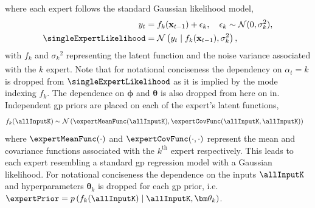\documentclass{mimosis-class/mimosis}
\numberwithin{equation}{chapter}
\newcommand{\numData}{\ensuremath{t}}
\newcommand{\modeInd}{\ensuremath{k}}
\newcommand{\singleData}[1]{\ensuremath{#1_{\numData}}}
\newcommand{\allData}[1]{\ensuremath{\MakeUppercase{#1}}}
\newcommand{\mode}[1]{\ensuremath{#1_{\modeInd}}}
\newcommand{\x}{\ensuremath{\mathbf{x}}}
\newcommand{\y}{\ensuremath{y}}
\newcommand{\singleInput}{\ensuremath{\x_{\numData-1}}}
\newcommand{\singleOutput}{\ensuremath{\singleData{\y}}}
\newcommand{\allInput}{\ensuremath{\allData{\x}}}
\newcommand{\noiseVar}{\ensuremath{\sigma}}
\newcommand{\modeVar}{\ensuremath{\alpha}}
\newcommand{\modeVarn}{\ensuremath{\singleData{\modeVar}}}
\newcommand{\modeVarK}{\ensuremath{\modeVarn=\modeInd}}
\newcommand{\latentFunc}{\ensuremath{f}}
\newcommand{\gatingParams}{\ensuremath{\bm\phi}}
\newcommand{\expertParams}{\ensuremath{\bm\theta}}
\newcommand{\expertParamsK}{\ensuremath{\mode{\bm\theta}}}
\begin{document}
{where each expert follows the standard Gaussian likelihood model,
\begin{align} \label{eq-expert-likelihood}
\singleOutput &= \mode{f}(\singleInput) + \epsilon_{k}, \quad \epsilon_{k} \sim \mathcal{N}(0, \mode{\noiseVar}^2), \\
\singleExpertLikelihood &= \mathcal{N}\left( \singleOutput \mid \mode{f}(\singleInput), \mode{\noiseVar}^2 \right),
\end{align}
with \(\mode{f}\) and \(\mode{\noiseVar}^2\) representing the latent function and the noise variance associated
with the \(\modeInd\)\textsuperscript{} expert.
Note that for notational conciseness the dependency on \(\modeVarK\) is dropped from
\(\singleExpertLikelihood\) as it is implied by the mode indexing \(\mode{\latentFunc}\).
The dependence on \(\gatingParams\) and \(\expertParams\) is also dropped from here on in.
Independent \acrshort{gp} priors are placed on each of the expert's latent functions,
\begin{align} \label{eq-single-expert-prior}
\mode{\latentFunc}(\allInputK) &\sim \mathcal{N}\left( \expertMeanFunc(\allInputK), \expertCovFunc(\allInputK, \allInputK) \right)
\end{align}
where \(\expertMeanFunc(\cdot)\) and \(\expertCovFunc(\cdot, \cdot)\) represent the mean and
covariance functions associated with the \(\modeInd^{\text{th}}\) expert respectively.
This leads to each expert resembling a standard \acrshort{gp} regression model with a Gaussian likelihood.
For notational conciseness the dependence on the inputs \(\allInputK\) and hyperparameters \(\expertParamsK\)
is dropped for each \acrshort{gp} prior,
i.e. \(\expertPrior = p\left( \mode{f}(\allInputK) \mid \allInputK, \expertParamsK \right)\).

}
\end{document}
